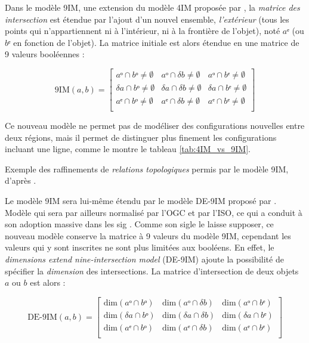 Dans le modèle 9IM, une extension du modèle 4IM proposée par
\textcite{Egenhofer1991}, la \emph{matrice des intersection} est
étendue par l'ajout d'un nouvel ensemble, \emph{l'extérieur} (\ie tous
les points qui n'appartiennent ni à l'intérieur, ni à la frontière de
l'objet), noté \(aᵉ\) (ou \(bᵉ\) en fonction de l'objet). La matrice
initiale est alors étendue en une matrice de 9 valeurs booléennes :

\begin{equation}
  \label{eq:matrice_9IM}
  \text{9IM}(a,b) =
  \begin{bmatrix}
    aᵒ ∩ bᵒ ≠ ∅ & aᵒ ∩ δb ≠ ∅ & aᵒ ∩ bᵉ ≠ ∅ \\
    δa ∩ bᵒ ≠ ∅ & δa ∩ δb ≠ ∅ & δa ∩ bᵉ ≠ ∅ \\
    aᵉ ∩ bᵒ ≠ ∅ & aᵉ ∩ δb ≠ ∅ & aᵉ ∩ bᵉ ≠ ∅ \\
  \end{bmatrix}
\end{equation}

Ce nouveau modèle ne permet pas de modéliser des configurations
nouvelles entre deux régions, mais il permet de distinguer plus
finement les configurations incluant une ligne, comme le montre le
tableau \ref{tab:4IM_vs_9IM}.

\begin{table}
  \centering
  
  \caption{Exemple des raffinements de \emph{relations topologiques}
    permis par le modèle 9IM, d'après \textcite{Egenhofer2011}.}
  \label{tab:4IM_vs_9IM}
\end{table}

Le modèle 9IM sera lui-même étendu par le modèle DE-9IM proposé par
\textcite{Clementini1993}. Modèle qui sera par ailleurs normalisé par
l'OGC et par l'ISO, ce qui a conduit à son adoption massive dans les
\ac{sig} \autocite{Strobl2008}. Comme son sigle le laisse supposer, ce
nouveau modèle conserve la matrice à 9 valeurs du modèle 9IM,
cependant les valeurs qui y sont inscrites ne sont plus limitées aux
booléens. En effet, le \emph{dimensions extend nine-intersection
  model} (DE-9IM) ajoute la possibilité de spécifier la
\emph{dimension} des intersections. La matrice d'intersection de deux
objets \(a\) ou \(b\) est alors :

\begin{equation}
  \label{eq:matrice_DE9IM}
  \text{DE-9IM}(a,b) =
  \begin{bmatrix}
    \text{dim}(aᵒ ∩ bᵒ)&\text{dim}(aᵒ ∩ δb)&\text{dim}(aᵒ ∩ bᵉ)\\
    \text{dim}(δa ∩ bᵒ)&\text{dim}(δa ∩ δb)&\text{dim}(δa ∩ bᵉ)\\
    \text{dim}(aᵉ ∩ bᵒ)&\text{dim}(aᵉ ∩ δb)&\text{dim}(aᵉ ∩ bᵉ)\\
  \end{bmatrix}
\end{equation}

